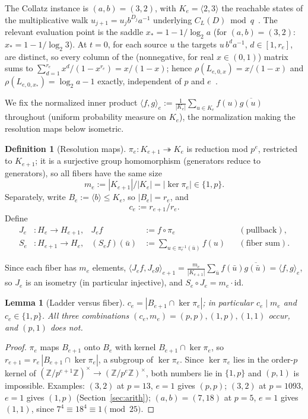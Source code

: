 \documentclass[11pt]{article}
\newtheorem{lemma}[theorem]{Lemma}
\theoremstyle{definition}
\newtheorem{definition}[theorem]{Definition}
\theoremstyle{remark}
\newcommand{\Z}{\mathbb{Z}}
\begin{document}
The Collatz instance is $(a,b)=(3,2)$, with $K_e=\langle 2,3\rangle$ the reachable states of the multiplicative walk $u_{j+1}=u_j b^{D_j}a^{-1}$ underlying $C_L(D)\bmod q$~\cite{DJ-fixedprime}. The relevant evaluation point is the saddle $x_*=1-1/\log_2 a$ (for $(a,b)=(3,2)$: $x_*=1-1/\log_2 3$). At $t=0$, for each source $u$ the targets $u\,b^da^{-1}$, $d\in[1,r_e]$, are distinct, so every column of the (nonnegative, for real $x\in(0,1)$) matrix sums to $\sum_{d=1}^{r_e}x^d/(1-x^{r_e})=x/(1-x)$; hence $\rho(L_{e,0,x})=x/(1-x)$ and $\rho(L_{e,0,x_*})=\log_2 a-1$ exactly, independent of $p$ and $e$~\cite{DJ-fixedprime}.

We fix the normalized inner product $\langle f,g\rangle_e:=\frac{1}{|K_e|}\sum_{u\in K_e}f(u)\overline{g(u)}$ throughout (uniform probability measure on $K_e$), the normalization making the resolution maps below isometric.

\begin{definition}[Resolution maps]
$\pi_e:K_{e+1}\twoheadrightarrow K_e$ is reduction mod $p^e$, restricted to $K_{e+1}$; it is a surjective group homomorphism (generators reduce to generators), so all fibers have the same size
\[
m_e:=|K_{e+1}|/|K_e|=|\ker\pi_e|\in\{1,p\}.
\]
Separately, write $B_e:=\langle b\rangle\le K_e$, so $|B_e|=r_e$, and
\[
c_e:=r_{e+1}/r_e .
\]
Define
\begin{align*}
J_e&:H_e\to H_{e+1}, & J_ef&:=f\circ\pi_e && (\text{pullback}),\\
S_e&:H_{e+1}\to H_e, & (S_ef)(\bar u)&:=\textstyle\sum_{u\in\pi_e^{-1}(\bar u)}f(u) && (\text{fiber sum}).
\end{align*}
\end{definition}

Since each fiber has $m_e$ elements, $\langle J_ef,J_eg\rangle_{e+1}=\frac{m_e}{|K_{e+1}|}\sum_{\bar u}f(\bar u)\overline{g(\bar u)}=\langle f,g\rangle_e$, so $J_e$ is an isometry (in particular injective), and $S_e\circ J_e=m_e\cdot\mathrm{id}$.

\begin{lemma}[Ladder versus fiber]\label{lem:cm}
$c_e=|B_{e+1}\cap\ker\pi_e|$; in particular $c_e\mid m_e$ and $c_e\in\{1,p\}$. All three combinations $(c_e,m_e)=(p,p),(1,p),(1,1)$ occur, and $(p,1)$ does not.
\end{lemma}

\begin{proof}
$\pi_e$ maps $B_{e+1}$ onto $B_e$ with kernel $B_{e+1}\cap\ker\pi_e$, so $r_{e+1}=r_e\,|B_{e+1}\cap\ker\pi_e|$, a subgroup of $\ker\pi_e$. Since $\ker\pi_e$ lies in the order-$p$ kernel of $(\Z/p^{e+1}\Z)^\times\to(\Z/p^e\Z)^\times$, both numbers lie in $\{1,p\}$ and $(p,1)$ is impossible. Examples: $(3,2)$ at $p=13$, $e=1$ gives $(p,p)$; $(3,2)$ at $p=1093$, $e=1$ gives $(1,p)$ (Section~\ref{sec:arith}); $(a,b)=(7,18)$ at $p=5$, $e=1$ gives $(1,1)$, since $7^4\equiv18^4\equiv1\pmod{25}$.
\end{proof}
\end{document}
